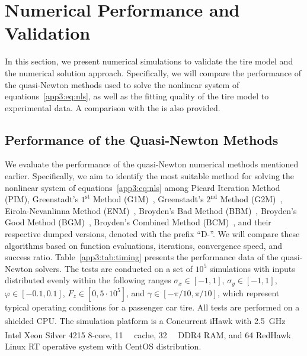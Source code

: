 
\section{Numerical Performance and Validation}
\label{app3:sec:numerical_experiments}

In this section, we present numerical simulations to validate the tire model and the numerical solution approach. Specifically, we will compare the performance of the quasi-Newton methods used to solve the nonlinear system of equations~\eqref{app3:eq:nls}, as well as the fitting quality of the tire model to experimental data. A comparison with the \MagicFormulae{} is also provided.

\subsection{Performance of the Quasi-Newton Methods}

We evaluate the performance of the quasi-Newton numerical methods mentioned earlier. Specifically, we aim to identify the most suitable method for solving the nonlinear system of equations~\eqref{app3:eq:nls} among Picard Iteration Method (PIM), Greenstadt's $1^\text{st}$ Method (G1M)~\cite{spedicato1978some}, Greenstadt's $2^\text{nd}$ Method (G2M)~\cite{spedicato1978some}, Eirola-Nevanlinna Method (ENM)~\cite{eirola1989accelerating}, Broyden's Bad Method (BBM)~\cite{broyden1965class},
Broyden's Good Method (BGM)~\cite{broyden1965class}, Broyden's Combined Method (BCM)~\cite{martinez1982sobre}, and their respective dumped versions, denoted with the prefix ``D-''. We will compare these algorithms based on function evaluations, iterations, convergence speed, and success ratio. Table~\ref{app3:tab:timing} presents the performance data of the quasi-Newton solvers. The tests are conducted on a set of $10^5$ simulations with inputs distributed evenly within the following ranges $\sigma_x\in[-1,1]$, $\sigma_y\in[-1,1]$, $\varphi\in[-0.1,0.1]$, $F_z\in[0,5\cdot10^5]$, and $\gamma \in [-\pi/10, \pi/10]$, which represent typical operating conditions for a passenger car tire. All tests are performed on a shielded CPU. The simulation platform is a Concurrent\textsuperscript{\textregistered} iHawk\textsuperscript{\texttrademark} with \SI{2.5}{\giga\hertz} Intel\textsuperscript{\textregistered} Xeon\textsuperscript{\textregistered} Silver 4215 8-core, \SI{11}{\mega\byte} cache, \SI{32}{\giga\byte} DDR4 \ac{RAM}, and \SI{64}{\bit} RedHawk\textsuperscript{\texttrademark} Linux \ac{RT} operative system with CentOS distribution.

